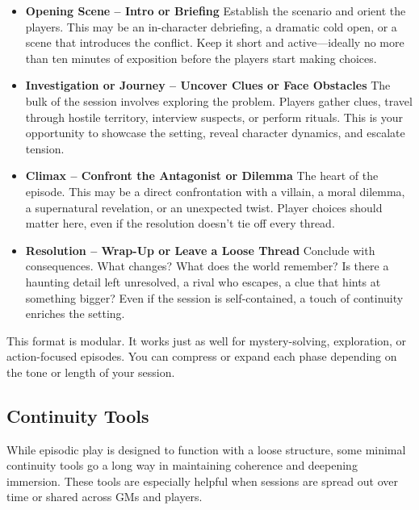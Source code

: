 \begin{itemize}
    \item \textbf{Opening Scene – Intro or Briefing}  
    Establish the scenario and orient the players. This may be an in-character debriefing, a dramatic cold open, or a scene that introduces the conflict. Keep it short and active—ideally no more than ten minutes of exposition before the players start making choices.

    \item \textbf{Investigation or Journey – Uncover Clues or Face Obstacles}  
    The bulk of the session involves exploring the problem. Players gather clues, travel through hostile territory, interview suspects, or perform rituals. This is your opportunity to showcase the setting, reveal character dynamics, and escalate tension.

    \item \textbf{Climax – Confront the Antagonist or Dilemma}  
    The heart of the episode. This may be a direct confrontation with a villain, a moral dilemma, a supernatural revelation, or an unexpected twist. Player choices should matter here, even if the resolution doesn’t tie off every thread.

    \item \textbf{Resolution – Wrap-Up or Leave a Loose Thread}  
    Conclude with consequences. What changes? What does the world remember? Is there a haunting detail left unresolved, a rival who escapes, a clue that hints at something bigger? Even if the session is self-contained, a touch of continuity enriches the setting.
\end{itemize}

This format is modular. It works just as well for mystery-solving, exploration, or action-focused episodes. You can compress or expand each phase depending on the tone or length of your session.

\subsection*{Continuity Tools}

While episodic play is designed to function with a loose structure, some minimal continuity tools go a long way in maintaining coherence and deepening immersion. These tools are especially helpful when sessions are spread out over time or shared across GMs and players.

